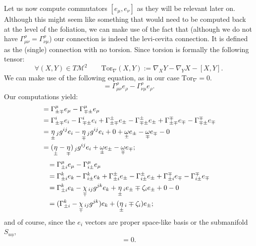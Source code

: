 \documentclass[a4paper,11pt]{article}
\numberwithin{equation}{section}
\theoremstyle{definition}
\begin{document}
Let us now compute commutators $[e_\mu,e_\nu]$ as they will be relevant later on. Although this might seem like something that would need to be computed back at the level of the foliation, we can make use of the fact that (although we do not have $\Gamma_{\mu\nu}^\rho=\Gamma_{\nu\mu}^\rho$) our connection is indeed the levi-cevita connection. It is defined as the (single) connection with no torsion. Since torsion is formally the following tensor:
\begin{equation}
\forall (X,Y) \in T\mathcal{M}^2 \quad\quad  \mathrm{Tor}_\nabla(X,Y):= \nabla_XY-\nabla_YX-[X,Y].
\end{equation}
We can make use of the following equation, as in our case $\mathrm{Tor}_\nabla=0$.
\begin{equation}
    [e_\mu,e_\nu]=\Gamma_{\mu\nu}^\rho e_\rho-\Gamma_{\nu\mu}^\rho e_\rho.
\end{equation}
Our computations yield:
\begin{align}
    [e_\pm,e_\mp]&=\Gamma_{\pm\mp}^\mu e_\mu - \Gamma_{\mp\pm}^\mu e_\mu\notag\\
    &=\Gamma_{\pm\mp}^i e_i - \Gamma_{\mp\pm}^i e_i + \Gamma_{\pm\mp}^\pm e_\pm - \Gamma_{\mp\pm}^\pm e_\pm + \Gamma_{\pm\mp}^\mp e_\mp - \Gamma_{\mp\pm}^\mp e_\mp\notag\\
    &=\underset{\pm}{\eta}\,_jg^{ij} e_i - \underset{\mp}{\eta}\,_jg^{ij} e_i + 0 + \underset{\pm}{\omega} e_\pm - \underset{\mp}{\omega} e_\mp - 0\notag\\
    &=(\underset{\pm}{\eta}-\underset{\mp}{\eta})\,_jg^{ij} e_i+ \underset{\pm}{\omega} e_\pm - \underset{\mp}{\omega} e_\mp\label{[pm,mp]};
\end{align}
\begin{align}
    [e_\pm,e_i]&=\Gamma_{\pm i}^\mu e_\mu - \Gamma_{i\pm}^\mu e_\mu\notag\\
    &=\Gamma_{\pm i}^k e_k - \Gamma_{i\pm}^k e_k + \Gamma_{\pm i}^\pm e_\pm - \Gamma_{i\pm}^\pm e_\pm + \Gamma_{\pm i}^\mp e_\mp - \Gamma_{i\pm}^\mp e_\mp\notag\\
    &=\Gamma_{\pm i}^k e_k - \underset{\mp}{\chi}\,_{ij}g^{jk} e_k + \underset{\pm}{\eta}\,_i e_\pm \mp \zeta_i e_\pm + 0 - 0\notag\\
    &=(\Gamma_{\pm i}^k - \underset{\mp}{\chi}\,_{ij}g^{jk}) e_k + (\underset{\pm}{\eta}\,_i \mp \zeta_i) e_\pm \label{[pm,i]};
\end{align}
and of course, since the $e_i$ vectors are proper space-like basis or the submanifold $S_{u\underline{u}}$, 
\begin{equation}[e_i,e_j]=0 \label{[i,j]}.\end{equation}
\end{document}
